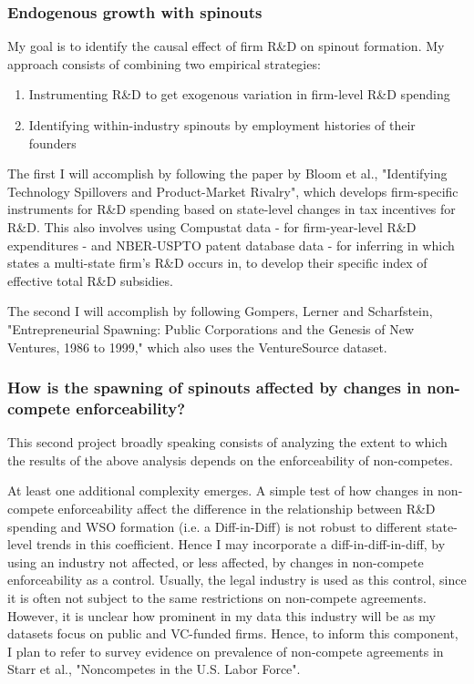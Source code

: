 \documentclass[12pt,english]{article}
\theoremstyle{remark}
\begin{document}
\subsubsection{Endogenous growth with spinouts}

My goal is to identify the causal effect of firm R\&D on spinout formation. My approach consists of combining two empirical strategies:
\begin{enumerate}
	\item Instrumenting R\&D to get exogenous variation in firm-level R\&D spending
	\item Identifying within-industry spinouts by employment histories of their founders
\end{enumerate}

The first I will accomplish by following the paper by Bloom et al., "Identifying Technology Spillovers and Product-Market Rivalry", which develops firm-specific instruments for R\&D spending based on state-level changes in tax incentives for R\&D. This also involves using Compustat data - for firm-year-level R\&D expenditures - and NBER-USPTO patent database data - for inferring in which states a multi-state firm's R\&D occurs in, to develop their specific index of effective total R\&D subsidies. 

The second I will accomplish by following Gompers, Lerner and Scharfstein, "Entrepreneurial Spawning: Public Corporations and the Genesis of New Ventures, 1986 to 1999," which also uses the VentureSource dataset. 

\subsubsection{How is the spawning of spinouts affected by changes in non-compete enforceability?}

This second project broadly speaking consists of analyzing the extent to which the results of the above analysis depends on the enforceability of non-competes.

At least one additional complexity emerges. A simple test of how changes in non-compete enforceability affect the difference in the relationship between R\&D spending and WSO formation (i.e. a Diff-in-Diff) is not robust to different state-level trends in this coefficient. Hence I may incorporate a diff-in-diff-in-diff, by using an industry not affected, or less affected, by changes in non-compete enforceability as a control. Usually, the legal industry is used as this control, since it is often not subject to the same restrictions on non-compete agreements. However, it is unclear how prominent in my data this industry will be as my datasets focus on public and VC-funded firms. Hence, to inform this component, I plan to refer to survey evidence on prevalence of non-compete agreements in Starr et al., "Noncompetes in the U.S. Labor Force". 
\end{document}
